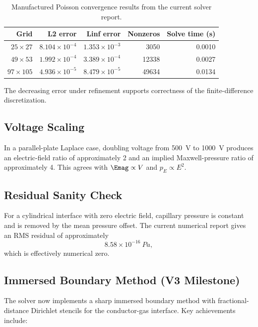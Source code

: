 \begin{table}[H]
\centering
\caption{Manufactured Poisson convergence results from the current solver report.}
\label{tab:poisson-convergence}
\begin{tabular}{rrrrr}
\toprule
Grid & L2 error & Linf error & Nonzeros & Solve time (s) \\
\midrule
$25\times 27$ & $8.104\times 10^{-4}$ & $1.353\times 10^{-3}$ & 3050 & 0.0010 \\
$49\times 53$ & $1.992\times 10^{-4}$ & $3.389\times 10^{-4}$ & 12338 & 0.0027 \\
$97\times 105$ & $4.936\times 10^{-5}$ & $8.479\times 10^{-5}$ & 49634 & 0.0134 \\
\bottomrule
\end{tabular}
\end{table}

The decreasing error under refinement supports correctness of the finite-difference discretization.

\subsection{Voltage Scaling}

In a parallel-plate Laplace case, doubling voltage from \SI{500}{V} to \SI{1000}{V} produces an electric-field ratio of approximately 2 and an implied Maxwell-pressure ratio of approximately 4. This agrees with $\Emag\propto V$ and $p_E\propto E^2$.

\subsection{Residual Sanity Check}

For a cylindrical interface with zero electric field, capillary pressure is constant and is removed by the mean pressure offset. The current numerical report gives an RMS residual of approximately
\begin{equation*}
8.58\times 10^{-16}\ \si{Pa},
\end{equation*}
which is effectively numerical zero.

\subsection{Immersed Boundary Method (V3 Milestone)}

The solver now implements a sharp immersed boundary method with fractional-distance Dirichlet stencils for the conductor-gas interface. Key achievements include:

